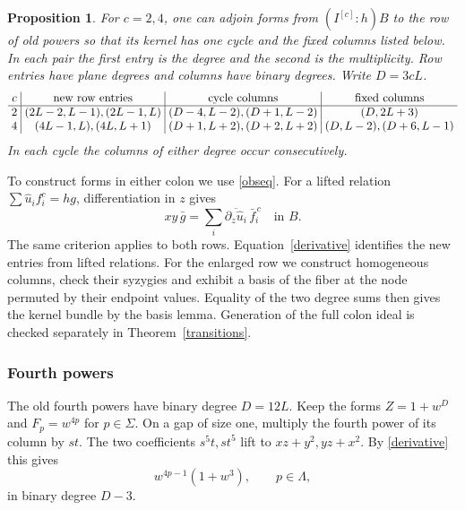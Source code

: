 \documentclass[11pt,a4paper,reqno]{amsart}
\numberwithin{equation}{section}
\theoremstyle{plain}
\newtheorem{proposition}[theorem]{Proposition}
\begin{document}
\begin{proposition}\label{prop:model-rows}
For $c=2,4$, one can adjoin forms from $(I^{[c]}:h)B$ to the row of old powers so that its kernel has one cycle and the fixed columns listed below. In each pair the first entry is the degree and the second is the multiplicity. Row entries have plane degrees and columns have binary degrees. Write $D=3cL$.
\[
\setlength{\arraycolsep}{3pt}
\begin{array}{c|c|c|c}
 c & \text{new row entries} & \text{cycle columns} & \text{fixed columns}\\ \hline
 2 & (2L-2,L-1),(2L-1,L)
   & (D-4,L-2),(D+1,L-2) & (D,2L+3)\\
 4 & (4L-1,L),(4L,L+1)
   & (D+1,L+2),(D+2,L+2) & (D,L-2),(D+6,L-1)
\end{array}
\]
In each cycle the columns of either degree occur consecutively.
\end{proposition}

To construct forms in either colon we use \eqref{obseq}. For a lifted relation $\sum\widehat u_i f_i^c=hg$, differentiation in $z$ gives
\begin{equation}\label{derivative}
 xy\,\bar g=\sum_i\overline{\partial_z\widehat u_i}\,\bar f_i^{\,c}\quad\text{in }B .
\end{equation}
The same criterion applies to both rows. Equation~\eqref{derivative} identifies the new entries from lifted relations. For the enlarged row we construct homogeneous columns, check their syzygies and exhibit a basis of the fiber at the node permuted by their endpoint values. Equality of the two degree sums then gives the kernel bundle by the basis lemma. Generation of the full colon ideal is checked separately in Theorem~\ref{transitions}.

\subsubsection{Fourth powers}\label{sec:cubic:four}
The old fourth powers have binary degree $D=12L$. Keep the forms $Z=1+w^D$ and $F_p=w^{4p}$ for $p\in\Sigma$. On a gap of size one, multiply the fourth power of its column by $st$. The two coefficients $s^5t,st^5$ lift to $xz+y^2,yz+x^2$. By \eqref{derivative} this gives
\[
 w^{4p-1}(1+w^3),\qquad p\in\Lambda ,
\]
in binary degree $D-3$.
\end{document}
